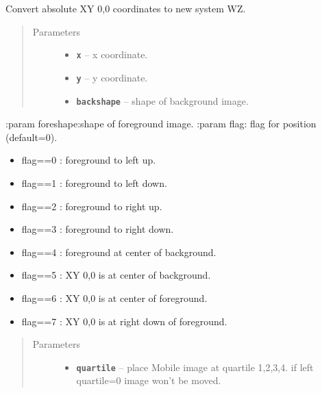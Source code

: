 \documentclass[letterpaper,10pt,english]{sphinxmanual}
\begin{document}

\begin{fulllineitems}
\label{RRtoolbox.lib.arrayops:RRtoolbox.lib.arrayops.basic.convertXY}
Convert absolute XY 0,0 coordinates to new system WZ.
\begin{quote}\begin{description}
\item[{Parameters}] \leavevmode\begin{itemize}
\item {} 
\textbf{\texttt{x}} -- x coordinate.

\item {} 
\textbf{\texttt{y}} -- y coordinate.

\item {} 
\textbf{\texttt{backshape}} -- shape of background image.

\end{itemize}

\end{description}\end{quote}

:param foreshape:shape of foreground image.
:param flag: flag for position (default=0).
\begin{itemize}
\item {} 
flag==0 : foreground to left up.

\item {} 
flag==1 : foreground to left down.

\item {} 
flag==2 : foreground to right up.

\item {} 
flag==3 : foreground to right down.

\item {} 
flag==4 : foreground at center of background.

\item {} 
flag==5 : XY 0,0 is at center of background.

\item {} 
flag==6 : XY 0,0 is at center of foreground.

\item {} 
flag==7 : XY 0,0 is at right down of foreground.

\end{itemize}
\begin{quote}\begin{description}
\item[{Parameters}] \leavevmode\begin{itemize}
\item {} 
\textbf{\texttt{quartile}} -- place Mobile image at quartile 1,2,3,4.
if left quartile=0 image won't be moved.


\end{itemize}
\end{description}
\end{quote}
\end{fulllineitems}
\end{document}
